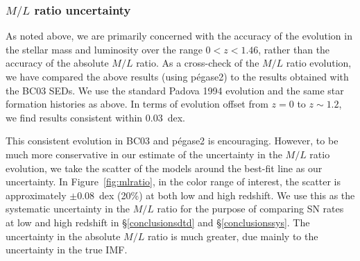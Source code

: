 \subsubsection{$M/L$ ratio uncertainty}

As noted above, we are primarily concerned with the accuracy of the
evolution in the stellar mass and luminosity over the range
$0<z<1.46$, rather than the accuracy of the absolute $M/L$ ratio.  As
a cross-check of the $M/L$ ratio evolution, we have compared the above
results (using {\sc p{\'e}gase2}) to the results obtained with the
BC03 SEDs. We use the standard Padova 1994 evolution and the same star
formation histories as above. In terms of evolution offset from $z=0$
to $z \sim 1.2$, we find results consistent within 0.03~dex.

This consistent evolution in BC03 and {\sc p{\'e}gase2} is
encouraging. However, to be much more conservative in our estimate of
the uncertainty in the $M/L$ ratio evolution, we take the scatter of
the models around the best-fit line as our uncertainty. In
Figure~\ref{fig:mlratio}, in the color range of interest, the scatter
is approximately $\pm 0.08$~dex (20\%) at both low and high
redshift. We use this as the systematic uncertainty in the $M/L$ ratio
for the purpose of comparing SN rates at low and high redshift
in \S\ref{conclusionsdtd} and \S\ref{conclusionssys}. The uncertainty
in the absolute $M/L$ ratio is much greater, due mainly to the
uncertainty in the true IMF.




%

